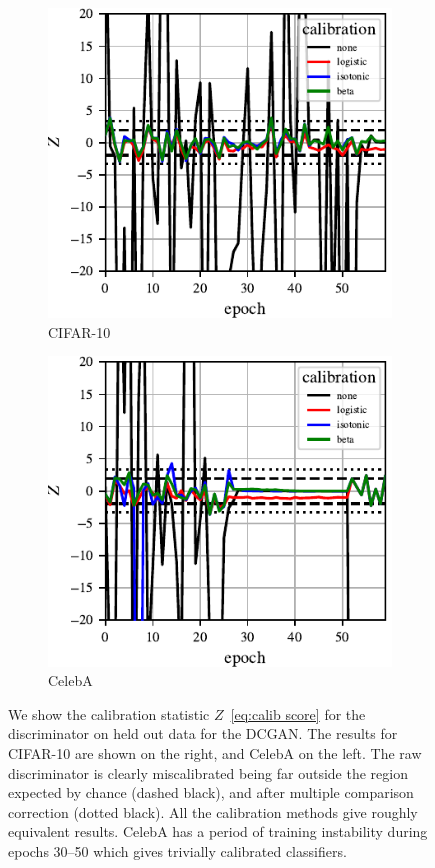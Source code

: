 \begin{figure}
    \centering
    \begin{subfigure}[b]{0.49\textwidth}
       \centering
       \includegraphics[scale=0.9]{figures/disc_calib_cifar_zoom.pdf}
       \caption{CIFAR-10}
       \label{fig:calibration cifar}
    \end{subfigure}
    \begin{subfigure}[b]{0.49\textwidth}
       \centering
       \includegraphics[scale=0.9]{figures/disc_calib_celeba_zoom.pdf}
       \caption{CelebA}
       \label{fig:calibration CelebA}
    \end{subfigure}
    \caption{{\small
    We show the calibration statistic $Z$~\eqref{eq:calib score} for the discriminator on held out data for the DCGAN\@.
    The results for CIFAR-10 are shown on the right, and CelebA on the left.
    The raw discriminator is clearly miscalibrated being far outside the region expected by chance (dashed black), and after multiple comparison correction (dotted black)\@.
    All the calibration methods give roughly equivalent results.
    CelebA has a period of training instability during epochs 30--50 which gives trivially calibrated classifiers.
    }}
    \label{fig:calibration}
\end{figure}

